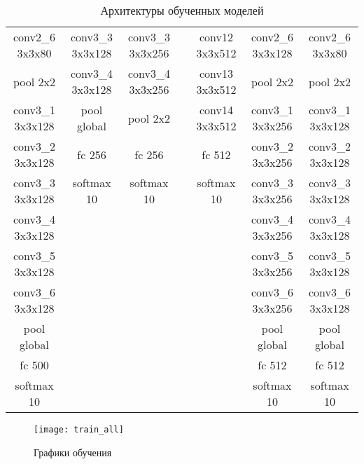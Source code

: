 \begin{table}[h]
{\begin{tabular}{|c|c|c|c|c|c|c|}
    conv2\_6 3x3x80  & conv3\_3 3x3x128  & conv3\_3 3x3x256   &                   & conv12 3x3x512   & conv2\_6 3x3x128  & conv2\_6 3x3x80    \\
    pool 2x2         & conv3\_4 3x3x128  & conv3\_4 3x3x256   &                   & conv13 3x3x512   & pool 2x2          & pool 2x2           \\ \cline{1-1} \cline{6-7} 
    conv3\_1 3x3x128 & pool global       & pool 2x2           &                   & conv14 3x3x512   & conv3\_1 3x3x256  & conv3\_1 3x3x128   \\ \cline{2-3} \cline{5-5}
    conv3\_2 3x3x128 & fc 256            & fc 256             &                   & fc 512           & conv3\_2 3x3x256  & conv3\_2 3x3x128   \\
    conv3\_3 3x3x128 & softmax 10        & softmax 10         &                   & softmax 10       & conv3\_3 3x3x256  & conv3\_3 3x3x128   \\
    conv3\_4 3x3x128 &                   &                    &                   &                  & conv3\_4 3x3x256  & conv3\_4 3x3x128   \\
    conv3\_5 3x3x128 &                   &                    &                   &                  & conv3\_5 3x3x256  & conv3\_5 3x3x128   \\
    conv3\_6 3x3x128 &                   &                    &                   &                  & conv3\_6 3x3x256  & conv3\_6 3x3x128   \\
    pool global      &                   &                    &                   &                  & pool global       & pool global        \\ \cline{1-1} \cline{6-7} 
    fc 500           &                   &                    &                   &                  & fc 512            & fc 512             \\
    softmax 10       &                   &                    &                   &                  & softmax 10        & softmax 10         \\ \hline
    \end{tabular}
}
\caption{Архитектуры обученных моделей}
\label{models-table}
\end{table}

\begin{figure}[H]
    \centering
    \texttt{[image: train\_all]}
    \caption{Графики обучения}
    \label{fig:train_all}
\end{figure}